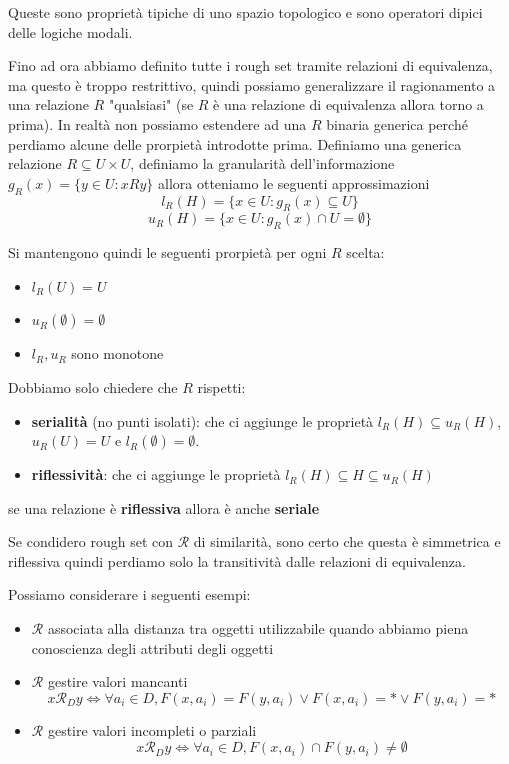 \begin{nota}
    Queste sono proprietà tipiche di uno spazio topologico e sono operatori dipici
    delle logiche modali.        
\end{nota}

Fino ad ora abbiamo definito tutte i rough set tramite relazioni di equivalenza,
ma questo è troppo restrittivo, quindi possiamo generalizzare il ragionamento a una 
relazione $R$ "qualsiasi" (se $R$ è una relazione di equivalenza allora torno a prima). 
In realtà non possiamo estendere ad una $R$ binaria generica perché perdiamo 
alcune delle prorpietà introdotte prima. 
Definiamo una generica relazione $R\subseteq U\times U$, definiamo la granularità
dell'informazione $g_R(x) = \{y\in U: xR y\}$ allora otteniamo le seguenti approssimazioni
$$l_R(H) = \{x\in U:g_R(x)\subseteq U\}$$
$$u_R(H) = \{x\in U:g_R(x)\cap U = \emptyset\}$$

Si mantengono quindi le seguenti prorpietà per ogni $R$ scelta:
\begin{itemize}
    \item $l_R(U) = U$ 
    \item $u_R(\emptyset) = \emptyset$
    \item $l_R,u_R$ sono monotone
\end{itemize} 
Dobbiamo solo chiedere che $R$ rispetti:
\begin{itemize}
    \item \textbf{serialità} (no punti isolati): che ci aggiunge le proprietà $l_R(H) \subseteq u_R(H)$,
    $u_R(U) =U$ e $l_R(\emptyset) = \emptyset$.
    \item \textbf{riflessività}: che ci aggiunge le proprietà $l_R(H)\subseteq H \subseteq u_R(H)$
\end{itemize}

\begin{nota}
    se una relazione è \textbf{riflessiva} allora è anche \textbf{seriale}
\end{nota}

Se condidero rough set con $\mathcal{R}$ di similarità, sono certo che questa è simmetrica 
e riflessiva quindi perdiamo solo la transitività dalle relazioni di equivalenza.

Possiamo considerare i seguenti esempi:
\begin{itemize}
    \item $\mathcal{R}$ associata alla distanza tra oggetti utilizzabile quando 
    abbiamo piena conoscienza degli attributi degli oggetti
    \item $\mathcal{R}$ gestire valori mancanti
    $$x\mathcal{R}_Dy\iff \forall a_i\in D, F(x, a_i) = F(y,a_i) \lor F(x, a_i)=\ast \lor F(y, a_i)=\ast $$
    \item $\mathcal{R}$ gestire valori incompleti o parziali
    $$x\mathcal{R}_Dy\iff \forall a_i\in D, F(x, a_i) \cap F(y,a_i) \ne \emptyset$$
\end{itemize}

